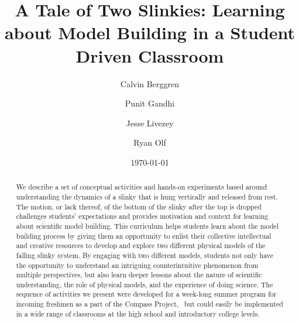 \documentclass[prb,preprint,superscriptaddress]{revtex4-1}
\begin{document}
\title{A Tale of Two Slinkies: Learning about Model Building in a Student Driven Classroom}
\author{Calvin Berggren}
\author{Punit  Gandhi}
\author{Jesse Livezey}
\author{Ryan Olf}
\date{\today}

\begin{abstract}

We describe a set of conceptual activities and hands-on experiments based around understanding the dynamics of a slinky that is hung vertically and released from rest.
The motion, or lack thereof, of the bottom of the slinky after the top is dropped challenges students' expectations and provides motivation and context for learning about scientific model building.
This curriculum helps students learn about the model building process by giving them an opportunity to enlist their collective intellectual and creative resources to develop and explore two different physical models of the falling slinky system. By engaging with two different models, students not only have the opportunity to understand an intriguing counterintuitive phenomenon from multiple perspectives, but also learn deeper lessons about the nature of scientific understanding, the role of physical models, and the experience of doing science. 
The sequence of activities we present were developed for a week-long summer program for incoming freshmen as a part of the Compass Project,~\cite{albana2013} but could easily be implemented in a wide range of classrooms at the high school and introductory college levels.
\end{abstract}

\maketitle
\end{document}
